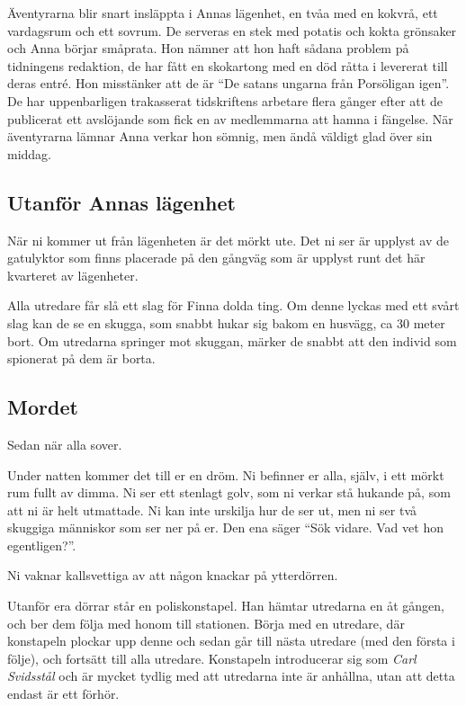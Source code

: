 Äventyrarna blir snart insläppta i Annas lägenhet, en tvåa med en kokvrå, ett vardagsrum och ett sovrum. De serveras en stek med potatis och kokta grönsaker och Anna börjar småprata. Hon nämner att hon haft sådana problem på tidningens redaktion, de har fått en skokartong med en död råtta i levererat till deras entré. Hon misstänker att de är ``De satans ungarna från Porsöligan igen''. De har uppenbarligen trakasserat tidskriftens arbetare flera gånger efter att de publicerat ett avslöjande som fick en av medlemmarna att hamna i fängelse. När äventyrarna lämnar Anna verkar hon sömnig, men ändå väldigt glad över sin middag. 

\subsection{Utanför Annas lägenhet}
När ni kommer ut från lägenheten är det mörkt ute. Det ni ser är upplyst av de gatulyktor som finns placerade på den gångväg som är upplyst runt det här kvarteret av lägenheter.

Alla utredare får slå ett slag för Finna dolda ting. Om denne lyckas med ett svårt slag kan de se en skugga, som snabbt hukar sig bakom en husvägg, ca 30 meter bort. Om utredarna springer mot skuggan, märker de snabbt att den individ som spionerat på dem är borta.

\subsection{Mordet}
Sedan när alla sover.

\begin{displayquote}
	Under natten kommer det till er en dröm. Ni befinner er alla, själv, i ett mörkt rum fullt av dimma. Ni ser ett stenlagt golv, som ni verkar stå hukande på, som att ni är helt utmattade. Ni kan inte urskilja hur de ser ut, men ni ser två skuggiga människor som ser ner på er. Den ena säger ``Sök vidare. Vad vet hon egentligen?''.

	Ni vaknar kallsvettiga av att någon knackar på ytterdörren.
\end{displayquote}
%
Utanför era dörrar står en poliskonstapel. Han hämtar utredarna en åt gången, och ber dem följa med honom till stationen. Börja med en utredare, där konstapeln plockar upp denne och sedan går till nästa utredare (med den första i följe), och fortsätt till alla utredare. Konstapeln introducerar sig som \textit{Carl Svidsstål} \sectiondescribe{\ref{kar:KonstapelCarlSvidstal}} och är mycket tydlig med att utredarna inte är anhållna, utan att detta endast är ett förhör. 

